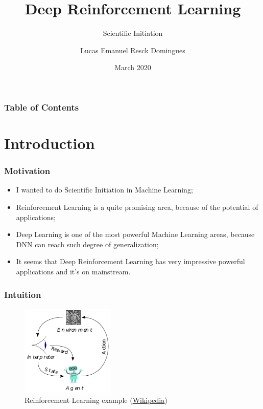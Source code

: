 \documentclass{beamer}
\title[Deep Reinforcement Learning]{Deep Reinforcement Learning}
\subtitle{Scientific Initiation}
\author[Resck]{Lucas Emanuel Resck Domingues}
\institute[FGV]
{
  Escola de Matemática Aplicada \\
  Fundação Getulio Vargas
}
\date[2020]
{March 2020}
\begin{document}
    \frame{\titlepage}

    \begin{frame}
        \frametitle{Table of Contents}
        \tableofcontents
    \end{frame}

    \section{Introduction}

        \begin{frame}
            \frametitle{Motivation}

            \begin{itemize}
                \item I wanted to do Scientific Initiation in Machine Learning;
                \item Reinforcement Learning is a quite promising area, because of the potential of applications;
                \item Deep Learning is one of the most powerful Machine Learning areas, because DNN can reach such degree of generalization;
                \item It seems that Deep Reinforcement Learning has very impressive powerful applications and it's on mainstream.
            \end{itemize}

        \end{frame}

        \begin{frame}
            \frametitle{Intuition}

            \begin{figure}
                \centering
                \includegraphics[width=0.4\textwidth]{figures/rl.png}
                \caption{Reinforcement Learning example (\href{https://en.wikipedia.org/wiki/Reinforcement_learning}{Wikipedia})}
                \label{fig14:rl}
            \end{figure}

        \end{frame}
\end{document}
